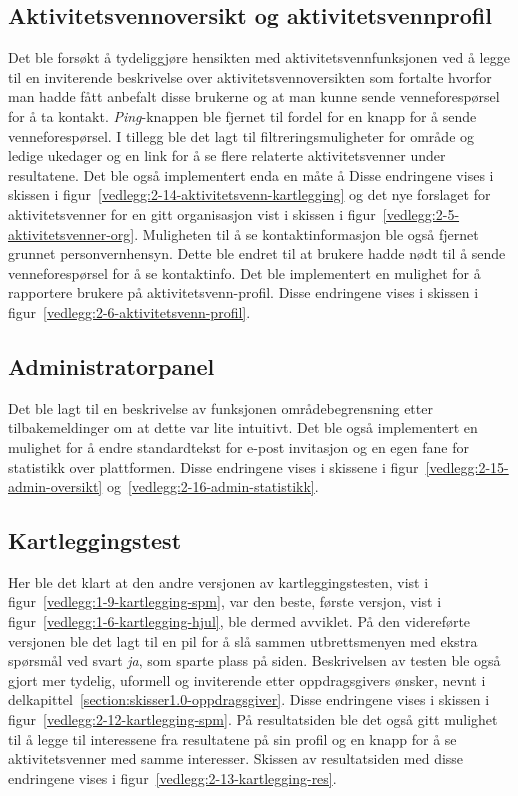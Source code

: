  
 \subsection{Aktivitetsvennoversikt og aktivitetsvennprofil}
 
 Det ble forsøkt å tydeliggjøre hensikten med aktivitetsvennfunksjonen ved å legge til en inviterende beskrivelse over aktivitetsvennoversikten som fortalte hvorfor man hadde fått anbefalt disse brukerne og at man kunne sende venneforespørsel for å ta kontakt. {\em Ping}-knappen ble fjernet til fordel for en knapp for å sende venneforespørsel. I tillegg ble det lagt til filtreringsmuligheter for område og ledige ukedager og en link for å se flere relaterte aktivitetsvenner under resultatene. Det ble også implementert enda en måte å  Disse endringene vises i skissen i figur~\ref{vedlegg:2-14-aktivitetsvenn-kartlegging} og det nye forslaget for aktivitetsvenner for en gitt organisasjon vist i skissen i figur~\ref{vedlegg:2-5-aktivitetsvenner-org}. Muligheten til å se kontaktinformasjon ble også fjernet grunnet personvernhensyn. Dette ble endret til at brukere hadde nødt til å sende venneforespørsel for å se kontaktinfo. Det ble implementert en mulighet for å rapportere brukere på aktivitetsvenn-profil. Disse endringene vises i skissen i figur~\ref{vedlegg:2-6-aktivitetsvenn-profil}.
 
 \subsection{Administratorpanel}
 Det ble lagt til en beskrivelse av funksjonen områdebegrensning etter tilbakemeldinger om at dette var lite intuitivt. Det ble også implementert en mulighet for å endre standardtekst for e-post invitasjon og en egen fane for statistikk over plattformen. Disse endringene vises i skissene i figur~\ref{vedlegg:2-15-admin-oversikt} og~\ref{vedlegg:2-16-admin-statistikk}.
 
 \subsection{Kartleggingstest}
 
 Her ble det klart at den andre versjonen av kartleggingstesten, vist i figur~\ref{vedlegg:1-9-kartlegging-spm}, var den beste, første versjon, vist i figur~\ref{vedlegg:1-6-kartlegging-hjul}, ble dermed avviklet. På den videreførte versjonen ble det lagt til en pil for å slå sammen utbrettsmenyen med ekstra spørsmål ved svart {\em ja}, som sparte plass på siden. Beskrivelsen av testen ble også gjort mer tydelig, uformell og inviterende etter oppdragsgivers ønsker, nevnt i delkapittel~\ref{section:skisser1.0-oppdragsgiver}. Disse endringene vises i skissen i figur~\ref{vedlegg:2-12-kartlegging-spm}. På resultatsiden ble det også gitt mulighet til å legge til interessene fra resultatene på sin profil og en knapp for å se aktivitetsvenner med samme interesser. Skissen av resultatsiden med disse endringene vises i figur~\ref{vedlegg:2-13-kartlegging-res}.
 

